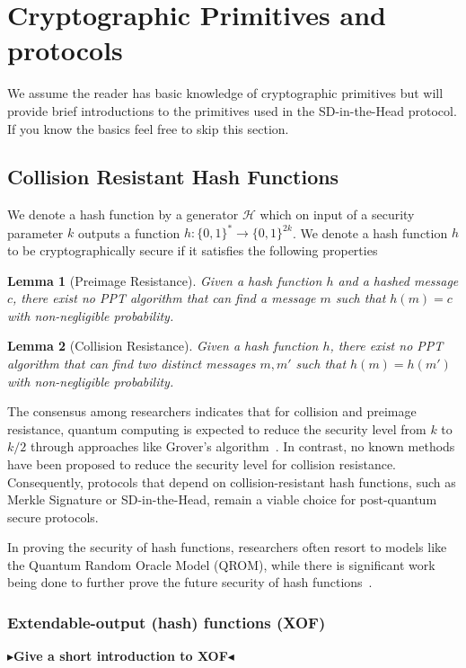 \documentclass[11pt]{report}
\theoremstyle{definition}
\theoremstyle{plain}
\newtheorem{lemma}{Lemma}[section]
\newcommand{\todo}[1]{{\color[rgb]{.5,0,0}\textbf{$\blacktriangleright$#1$\blacktriangleleft$}}}
\begin{document}
\section{Cryptographic Primitives and protocols}
We assume the reader has basic knowledge of cryptographic primitives but will provide brief introductions to the primitives used in the SD-in-the-Head protocol. If you know the basics feel free to skip this section.

\subsection{Collision Resistant Hash Functions}\label{sec:prelim_hash}
We denote a hash function by a generator $\mathcal{H}$ which on input of a security parameter $k$ outputs a function $h : \{0,1{\}}^* \rightarrow \{0,1{\}}^{2k}$. We denote a hash function $h$ to be cryptographically secure if it satisfies the following properties

\begin{lemma}[Preimage Resistance]\label{lem:preimage}
  Given a hash function $h$ and a hashed message $c$, there exist no PPT algorithm that can find a message $m$ such that $h(m) = c$ with non-negligible probability.
\end{lemma}

\begin{lemma}[Collision Resistance]\label{lem:collision}
  Given a hash function $h$, there exist no PPT algorithm that can find two distinct messages $m, m'$ such that $h(m) = h(m')$ with non-negligible probability.
\end{lemma}

The consensus among researchers indicates that for collision and preimage resistance, quantum computing is expected to reduce the security level from $k$ to $k/2$ through approaches like Grover's algorithm~\cite{nielsen2010quantumgrover}. In contrast, no known methods have been proposed to reduce the security level for collision resistance. Consequently, protocols that depend on collision-resistant hash functions, such as Merkle Signature or SD-in-the-Head, remain a viable choice for post-quantum secure protocols.

In proving the security of hash functions, researchers often resort to models like the Quantum Random Oracle Model (QROM), while there is significant work being done to further prove the future security of hash functions~\cite{dtuPostquantumSecurity}.

\subsubsection{Extendable-output (hash) functions (XOF)}\label{sec:xof}
\todo{Give a short introduction to XOF}
\end{document}

